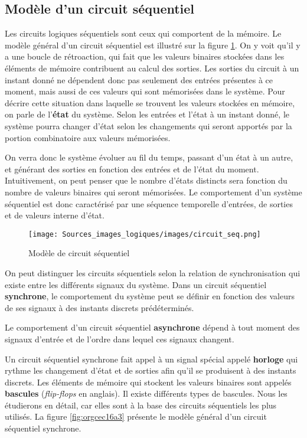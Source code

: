 \documentclass[11pt]{article}
\begin{document}
\subsection{Modèle d'un circuit séquentiel}
\label{sec:orgd326381}

Les circuits logiques séquentiels sont ceux qui comportent de la
mémoire. Le modèle général d'un circuit séquentiel est illustré sur la
figure \ref{fig:org1f709b2}. On y voit qu'il y a une boucle de rétroaction,
qui fait que les valeurs binaires stockées dans les éléments de
mémoire contribuent au calcul des sorties. Les sorties du circuit à un
instant donné ne dépendent donc pas seulement des entrées présentes à
ce moment, mais aussi de ces valeurs qui sont mémorisées dans le
système. Pour décrire cette situation dans laquelle se trouvent les
valeurs stockées en mémoire, on parle de l'\textbf{état} du système. Selon
les entrées et l'état à un instant donné, le système pourra changer
d'état selon les changements qui seront apportés par la portion
combinatoire aux valeurs mémorisées.

On verra donc le système évoluer au fil du temps, passant d'un état à
un autre, et générant des sorties en fonction des entrées et de l'état
du moment. Intuitivement, on peut penser que le nombre d'états
distincts sera fonction du nombre de valeurs binaires qui seront
mémorisées. Le comportement d'un système séquentiel est donc
caractérisé par une séquence temporelle d'entrées, de sorties et de
valeurs interne d'état.

\begin{figure}[htbp]
\centering
\texttt{[image: Sources\_images\_logiques/images/circuit\_seq.png]}
\caption{\label{fig:org1f709b2}Modèle de circuit séquentiel}
\end{figure}

On peut distinguer les circuits séquentiels selon la relation de
synchronisation qui existe entre les différents signaux du
système. Dans un circuit séquentiel \textbf{synchrone}, le comportement du
système peut se définir en fonction des valeurs de ses signaux à des
instants discrets prédéterminés. 

Le comportement d'un circuit séquentiel \textbf{asynchrone} dépend à tout
moment des signaux d'entrée et de l'ordre dans lequel ces signaux
changent.

Un circuit séquentiel synchrone fait appel à un signal spécial appelé
\textbf{horloge} qui rythme les changement d'état et de sorties afin qu'il se
produisent à des instants discrets. Les éléments de mémoire qui
stockent les valeurs binaires sont appelés \textbf{bascules} (\emph{flip-flops} en
anglais). Il existe différents types de bascules. Nous les étudierons
en détail, car elles sont à la base des circuits séquentiels les plus
utilisés. La figure \ref{fig:orgcec16a3} présente le modèle général d'un
circuit séquentiel synchrone.
\end{document}
